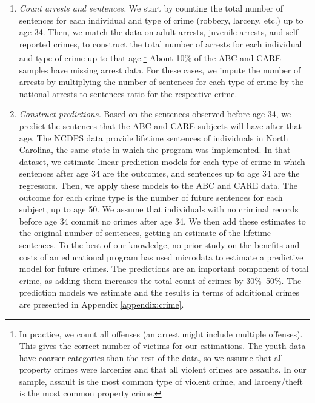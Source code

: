 \begin{enumerate}
\item \textit{Count arrests and sentences.} We start by counting the total number of sentences for each individual and type of crime (robbery, larceny, etc.) up to age 34. Then, we match the data on adult arrests, juvenile arrests, and self-reported crimes, to construct the total number of  arrests for each individual and type of crime up to that age.\footnote{In practice, we count all offenses (an arrest might include multiple offenses). This gives the correct number of victims for our estimations. The youth data have coarser categories than the rest of the data, so we assume that all property crimes were larcenies and that all violent crimes are assaults. In our sample, assault is the most common type of violent crime, and larceny/theft is the most common property crime.} About 10\% of the ABC and CARE samples have missing arrest data. For these cases, we impute the number of arrests by multiplying the number of sentences for each type of crime by the  national arrests-to-sentences ratio for the respective crime.
\item \textit{Construct predictions.} Based on the sentences observed before age 34, we predict the sentences that the ABC and CARE subjects will have after that age. The NCDPS data provide lifetime sentences of individuals in North Carolina, the same state in which the program was implemented. In that dataset, we estimate linear prediction models for each type of crime in which sentences after age 34 are the outcomes, and sentences up to age 34 are the regressors. Then, we apply these models to the ABC and CARE data. The outcome for each crime type is the number of future sentences for each subject, up to age 50. We assume that individuals with no criminal records before age 34 commit no crimes after age 34. We then add these estimates to the original number of sentences, getting an estimate of the lifetime sentences. To the best of our knowledge, no prior study on the benefits and costs of an educational program has used microdata to estimate a predictive model for future crimes. The predictions are an important component of total crime, as adding them increases the total count of crimes by 30\%--50\%. The prediction models we estimate and the results in terms of additional crimes are presented in Appendix \ref{appendix:crime}.

\end{enumerate}
